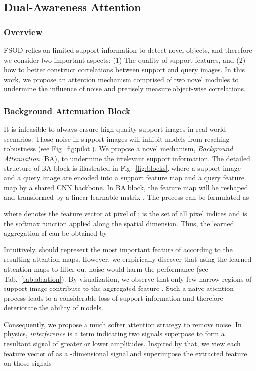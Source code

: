 \documentclass[journal]{IEEEtran}
\begin{document}
\subsection{Dual-Awareness Attention}
\subsubsection{Overview}
FSOD relies on limited support information to detect novel objects, and therefore we consider two important aspects: (1) The quality of support features, and (2) how to better construct correlations between support and query images.
In this work, we propose an attention mechanism comprised of two novel modules to undermine the influence of noise and precisely measure object-wise correlations.


\subsubsection{Background Attenuation Block}
It is infeasible to always ensure high-quality support images in real-world scenarios. 
Those noise in support images will inhibit models from reaching robustness (see Fig~\ref{fig:pilot}).
We propose a novel mechanism, \textit{Background Attenuation} (BA), to undermine the irrelevant support information.
The detailed structure of BA block is illustrated in Fig.~\ref{fig:blocks}, where a support image  and a query image  are encoded into a support feature map  and a query feature map  by a shared CNN backbone.
In BA block, the feature map  will be reshaped and transformed by a linear learnable matrix .
The process can be formulated as

where  denotes the feature vector at  pixel of ;  is the set of all pixel indices and  is the softmax function applied along the spatial dimension.
Thus, the learned aggregation of  can be obtained by 

Intuitively,  should represent the most important feature of  according to the resulting attention maps.
However, we empirically discover that using the learned attention maps to filter out noise would harm the performance (see Tab.~\ref{tab:ablation}).
By visualization, we observe that only few narrow regions of support image contribute to the aggregated feature .
Such a naive attention process leads to a considerable loss of support information and therefore deteriorate the ability of models.





Consequently, we propose a much softer attention strategy to remove noise.
In physics, \textit{interference} is a term indicating two signals superpose to form a resultant signal of greater or lower amplitudes.
Inspired by that, we view each feature vector of  as a -dimensional signal and superimpose the extracted feature  on those signals
\end{document}
